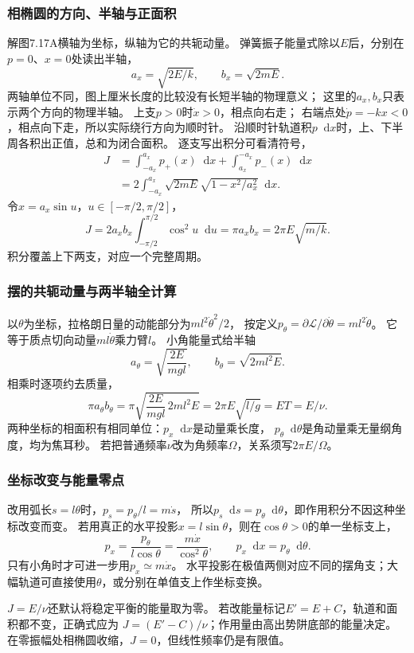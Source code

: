 \documentclass[UTF8,fontset=fandol,a4paper,11pt]{ctexart}
\newcommand{\dd}{\mathop{}\!\mathrm{d}}
\begin{document}
\subsubsection*{相椭圆的方向、半轴与正面积}
解图7.17A横轴为坐标，纵轴为它的共轭动量。
弹簧振子能量式除以$E$后，分别在$p=0$、$x=0$处读出半轴，
\[
a_x=\sqrt{2E/k},\qquad b_x=\sqrt{2mE}.
\]
两轴单位不同，图上厘米长度的比较没有长短半轴的物理意义；
这里的$a_x,b_x$只表示两个方向的物理半轴。
上支$p>0$时$\dot x>0$，相点向右走；
右端点处$\dot p=-kx<0$，相点向下走，所以实际绕行方向为顺时针。
沿顺时针轨道积$p\dd x$时，上、下半周各积出正值，总和为闭合面积。
逐支写出积分可看清符号，
\[
\begin{aligned}
J&=\int_{-a_x}^{a_x}p_+(x)\dd x+
\int_{a_x}^{-a_x}p_-(x)\dd x\\
&=2\int_{-a_x}^{a_x}\sqrt{2mE}\sqrt{1-x^2/a_x^2}\dd x.
\end{aligned}
\]
令$x=a_x\sin u$，$u\in[-\pi/2,\pi/2]$，
\[
J=2a_xb_x\int_{-\pi/2}^{\pi/2}\cos^2u\dd u
=\pi a_xb_x=2\pi E\sqrt{m/k}.
\]
积分覆盖上下两支，对应一个完整周期。

\subsubsection*{摆的共轭动量与两半轴全计算}
以$\theta$为坐标，拉格朗日量的动能部分为$ml^2\dot\theta^2/2$，
按定义$p_\theta=\partial\mathcal L/\partial\dot\theta=ml^2\dot\theta$。
它等于质点切向动量$ml\dot\theta$乘力臂$l$。
小角能量式给半轴
\[
a_\theta=\sqrt{\frac{2E}{mgl}},\qquad
b_\theta=\sqrt{2ml^2E}.
\]
相乘时逐项约去质量，
\[
\pi a_\theta b_\theta
=\pi\sqrt{\frac{2E}{mgl}\,2ml^2E}
=2\pi E\sqrt{l/g}=ET=E/\nu.
\]
两种坐标的相面积有相同单位：$p_x\dd x$是动量乘长度，
$p_\theta\dd\theta$是角动量乘无量纲角度，均为焦耳秒。
若把普通频率$\nu$改为角频率$\Omega$，关系须写$2\pi E/\Omega$。

\subsubsection*{坐标改变与能量零点}
改用弧长$s=l\theta$时，$p_s=p_\theta/l=m\dot s$，
所以$p_s\dd s=p_\theta\dd\theta$，即作用积分不因这种坐标改变而变。
若用真正的水平投影$x=l\sin\theta$，则在$\cos\theta>0$的单一坐标支上，
\[
p_x=\frac{p_\theta}{l\cos\theta}
=\frac{m\dot x}{\cos^2\theta},\qquad p_x\dd x=p_\theta\dd\theta.
\]
只有小角时才可进一步用$p_x\simeq m\dot x$。
水平投影在极值两侧对应不同的摆角支；大幅轨道可直接使用$\theta$，或分别在单值支上作坐标变换。

$J=E/\nu$还默认将稳定平衡的能量取为零。
若改能量标记$E'=E+C$，轨道和面积都不变，正确式应为
$J=(E'-C)/\nu$；作用量由高出势阱底部的能量决定。
在零振幅处相椭圆收缩，$J=0$，但线性频率仍是有限值。
\end{document}

